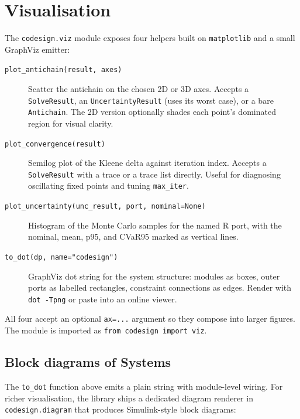 \documentclass[11pt,a4paper]{article}
\begin{document}
\section{Visualisation}
\label{sec:visualisation}

The \texttt{codesign.viz} module exposes four helpers built on
\texttt{matplotlib} and a small GraphViz emitter:

\begin{description}
\item[\texttt{plot\_antichain(result, axes)}] Scatter the antichain
  on the chosen 2D or 3D axes. Accepts a \texttt{SolveResult}, an
  \texttt{UncertaintyResult} (uses its worst case), or a bare
  \texttt{Antichain}. The 2D version optionally shades each point's
  dominated region for visual clarity.
\item[\texttt{plot\_convergence(result)}] Semilog plot of the
  Kleene delta against iteration index. Accepts a \texttt{SolveResult}
  with a trace or a trace list directly. Useful for diagnosing
  oscillating fixed points and tuning \texttt{max\_iter}.
\item[\texttt{plot\_uncertainty(unc\_result, port, nominal=None)}]
  Histogram of the Monte Carlo samples for the named R port, with
  the nominal, mean, p95, and CVaR95 marked as vertical lines.
\item[\texttt{to\_dot(dp, name="codesign")}] GraphViz dot string for the
  system structure: modules as boxes, outer ports as labelled
  rectangles, constraint connections as edges. Render with
  \texttt{dot -Tpng} or paste into an online viewer.
\end{description}

All four accept an optional \texttt{ax=...} argument so they compose
into larger figures. The module is imported as
\texttt{from codesign import viz}.

\subsection{Block diagrams of Systems}
\label{sec:block-diagrams}

The \texttt{to\_dot} function above emits a plain string with
module-level wiring. For richer visualisation, the library ships a
dedicated diagram renderer in \texttt{codesign.diagram} that produces
Simulink-style block diagrams:
\end{document}
